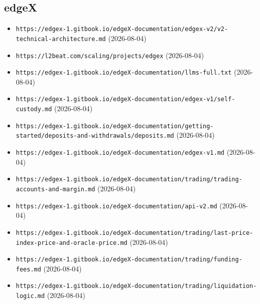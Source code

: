 \subsection*{edgeX}
\begin{itemize}\setlength{\itemsep}{0pt}\small
\item \texttt{https://edgex-1.gitbook.io/edgeX-documentation/edgex-v2/v2-technical-architecture.md} (2026-08-04)
\item \texttt{https://l2beat.com/scaling/projects/edgex} (2026-08-04)
\item \texttt{https://edgex-1.gitbook.io/edgeX-documentation/llms-full.txt} (2026-08-04)
\item \texttt{https://edgex-1.gitbook.io/edgeX-documentation/edgex-v1/self-custody.md} (2026-08-04)
\item \texttt{https://edgex-1.gitbook.io/edgeX-documentation/getting-started/deposits-and-withdrawals/deposits.md} (2026-08-04)
\item \texttt{https://edgex-1.gitbook.io/edgeX-documentation/edgex-v1.md} (2026-08-04)
\item \texttt{https://edgex-1.gitbook.io/edgeX-documentation/trading/trading-accounts-and-margin.md} (2026-08-04)
\item \texttt{https://edgex-1.gitbook.io/edgeX-documentation/api-v2.md} (2026-08-04)
\item \texttt{https://edgex-1.gitbook.io/edgeX-documentation/trading/last-price-index-price-and-oracle-price.md} (2026-08-04)
\item \texttt{https://edgex-1.gitbook.io/edgeX-documentation/trading/funding-fees.md} (2026-08-04)
\item \texttt{https://edgex-1.gitbook.io/edgeX-documentation/trading/liquidation-logic.md} (2026-08-04)
\end{itemize}

